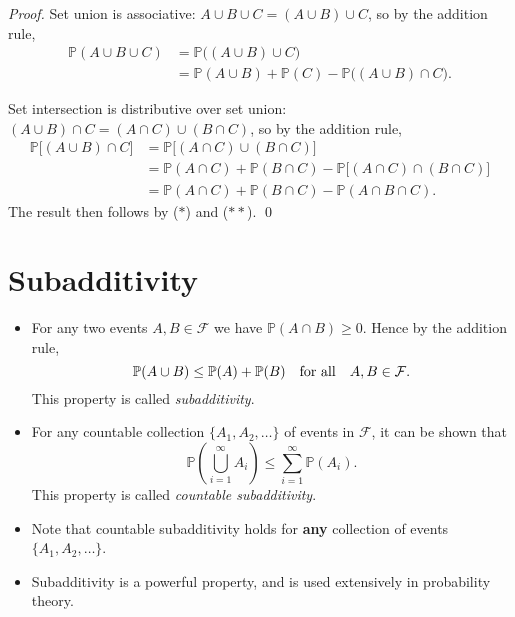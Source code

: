 \documentclass[lecture]{csm}
\newcommand{\prob}{\mathbb{P}}
\def\it{\item}
\def\bit{\begin{itemize}}
\def\eit{\end{itemize}}
\newcommand{\lt}{<}
\begin{document}
\begin{proof}
Set union is associative: $A\cup B\cup C = (A\cup B)\cup C$, so by the addition rule,
\begin{align}
\prob(A\cup B\cup C) 	
	& = \prob\big((A\cup B)\cup C\big) \nonumber \\
	& = \prob(A\cup B) + \prob(C) - \prob\big((A\cup B)\cap C\big). \tag{$\ast$}
\end{align}

Set intersection is distributive over set union: $(A\cup B)\cap C = (A\cap C)\cup (B\cap C)$, so by the addition rule,
\begin{align}	
\prob\big[(A\cup B)\cap C\big]
	& = \prob\big[(A\cap C)\cup (B\cap C)\big] \nonumber \\
	& = \prob(A\cap C) + \prob(B\cap C) - \prob\big[(A\cap C)\cap (B\cap C)\big] \nonumber \\
	& = \prob(A\cap C) + \prob(B\cap C) - \prob(A\cap B\cap C). \tag{$\ast\ast$}
\end{align}
The result then follows by ($\ast$) and ($\ast\ast$).
\qed
\end{proof}

%

\newpage
\section{Subadditivity}

\bit
\it
For any two events $A,B\in\mathcal{F}$ we have $\prob(A\cap B)\geq 0$.
Hence by the addition rule,
\[
\prob(A\cup B) \leq \prob(A) + \prob(B) \text{\quad for all\quad} A,B\in\mathcal{F}.
\]
This property is called \emph{subadditivity}.
\it
For any countable collection $\{A_1,A_2,\ldots\}$ of events in $\mathcal{F}$, it can be shown that 
\[
\prob\left(\bigcup_{i=1}^{\infty}A_i\right)\leq \sum_{i=1}^{\infty} \prob(A_i).
\]
This property is called \emph{countable subadditivity}.
\it
Note that countable subadditivity holds for \textbf{any} collection of events $\{A_1,A_2,\ldots\}$.
\it
Subadditivity is a powerful property, and is used extensively in probability theory.
\eit


\end{document}
